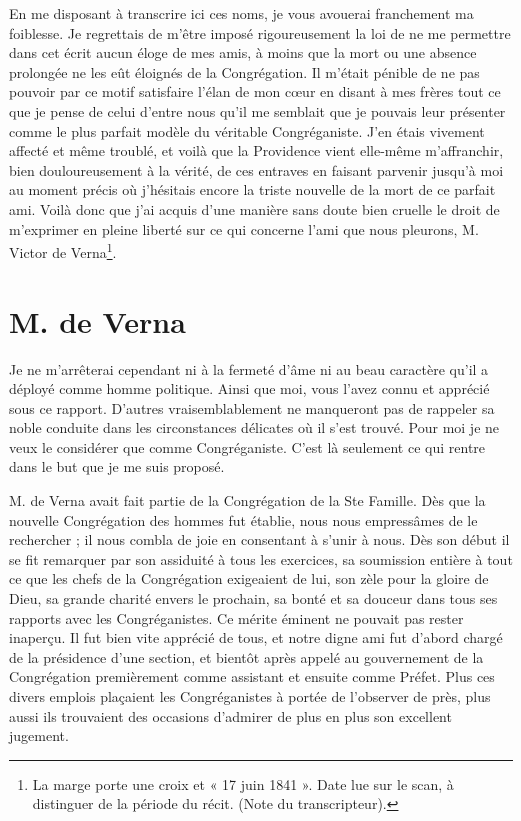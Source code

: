 En me disposant à transcrire ici ces noms, je vous avouerai franchement ma foiblesse. Je regrettais de m'être imposé
rigoureusement la loi de ne me permettre dans cet écrit aucun éloge de mes amis, à moins que la mort ou une absence prolongée ne les eût éloignés de la Congrégation. Il m'était pénible de ne pas pouvoir par ce motif satisfaire l'élan de mon cœur en disant à mes frères tout ce que je pense de celui d'entre nous qu'il me semblait que je pouvais leur présenter comme le plus parfait modèle du véritable Congréganiste. J'en étais vivement affecté et même troublé, et voilà que la Providence vient elle-même m'affranchir, bien douloureusement à la vérité, de ces entraves en faisant parvenir jusqu'à moi au moment précis où j'hésitais encore la triste nouvelle de la mort de ce parfait ami. Voilà donc que j'ai acquis d'une manière sans doute bien cruelle le droit de m'exprimer en pleine liberté sur ce qui concerne l'ami que nous pleurons, M. Victor de Verna\footnote{La marge porte une croix et « 17 juin 1841 ». Date lue sur le scan, à distinguer de la période du récit. (Note du transcripteur).}.

\section*{M. de Verna}
Je ne m'arrêterai cependant ni à la fermeté d'âme ni au beau caractère qu'il a déployé comme homme politique. Ainsi que moi, vous l'avez connu et apprécié sous ce rapport. D'autres vraisemblablement ne manqueront pas de rappeler sa noble conduite dans les circonstances délicates où il s'est trouvé. Pour moi je ne veux le considérer que comme Congréganiste. C'est là seulement ce qui rentre dans le but que je me suis proposé.

M. de Verna avait fait partie de la Congrégation de la Ste Famille. Dès que la nouvelle Congrégation des hommes fut établie, nous nous empressâmes de le rechercher ; il nous combla de joie en consentant à s'unir à nous. Dès son début il se fit remarquer par son assiduité à tous les exercices, sa soumission entière à tout ce que les chefs de la Congrégation
exigeaient de lui, son zèle pour la gloire de Dieu, sa grande charité envers le prochain, sa bonté et sa douceur dans tous ses rapports avec les Congréganistes. Ce mérite éminent ne pouvait pas rester inaperçu. Il fut bien vite apprécié de tous, et notre digne ami fut d'abord chargé de la présidence d'une section, et bientôt après appelé au gouvernement de la Congrégation premièrement comme assistant et ensuite comme Préfet. Plus ces divers emplois plaçaient les Congréganistes à portée de l'observer de près, plus aussi ils trouvaient des occasions d'admirer de plus en plus son excellent jugement.

